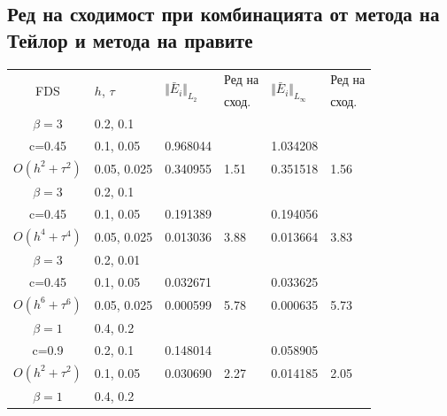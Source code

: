 \documentclass{article}
\begin{document}
\subsection{Ред на сходимост при комбинацията от метода на Тейлор и метода на правите}
\begin{table}[ht]
\centering
\small
		\begin{tabular}{||c|l|ll|ll||}
			\hline
			\hline


      \multirow{2  }{*}{FDS}        & \multirow{2  }{*}{$h$, $\tau$}  &	\multirow{2  }{*}{  $\Vert \bar E_i \Vert_{L_2} $ } 	&Ред на & \multirow{2  }{*}{  $\Vert \bar E_i \Vert_{L_\infty}$ }	&Ред на   \\
	                                        &                                                &    										&  сход. & 										& сход. \\
\hline 
\hline 
  $\beta=3$               &0.2, 0.1      &              	&           &                	&      \\
   c=0.45                   &0.1, 0.05    &0.968044  	&           &1.034208   &       \\
 $O(h^2 + \tau^ 2)$ 	&0.05, 0.025	& 0.340955 	& 1.51    &0.351518  	&  1.56      \\
\hline 
  $\beta=3$               &0.2, 0.1      &              	&          	&                 &      \\
   c=0.45                   &0.1, 0.05    &0.191389 	&          	&0.194056   	&       \\
$O(h^4+ \tau^4)$	&0.05, 0.025	&0.013036 	& 3.88   	&0.013664   	& 3.83       \\
\hline 
  $\beta=3$               &0.2, 0.01    &                	&          	&                 &      \\
     c=0.45                 &0.1, 0.05    &0.032671 	&          	& 0.033625  	&       \\
  $O(h^6+ \tau^6)$ 	&0.05, 0.025	&0.000599 	&5.78    	& 0.000635  	& 5.73       \\
\hline
\hline 
       $\beta=1$        	&0.4, 0.2      &             	&            &           &   \\
           c=0.9    		&0.2, 0.1      &  0.148014 	&            &0.058905 &   \\
  $O(h^2+ \tau^2)$  	&0.1, 0.05   	& 0.030690  	&2.27  	 &0.014185   & 2.05 \\
\hline
      $\beta=1$           &0.4, 0.2    	&            	&               &             &    \\

\end{tabular}
\end{table}
\end{document}
